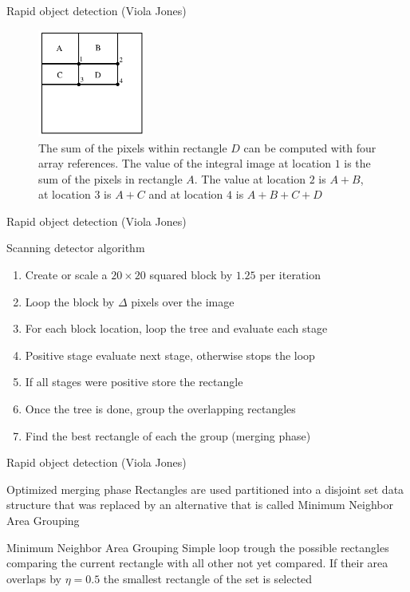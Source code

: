 \documentclass{beamer}
\begin{document}
\begin{frame}{Rapid object detection (Viola Jones)}
  \begin{figure}[!htb]
    \centering
    \includegraphics[width=100pt]{integral_image.pdf}
    \caption{The sum of the pixels within rectangle $D$ can be computed with four array references. The value of the integral image at location $1$ is the sum of the pixels in rectangle $A$. The value at location $2$ is $A + B$, at location $3$ is $A + C$ and at location $4$ is $A + B + C + D$}
    \label{figure:integral_image}
  \end{figure}
\end{frame}
\begin{frame}{Rapid object detection (Viola Jones)}
  \begin{block}{Scanning detector algorithm}
      \begin{enumerate}
        \item Create or scale a $20\times20$ squared block by $1.25$ per iteration
        \item Loop the block by $\Delta$ pixels over the image
        \item For each block location, loop the tree and evaluate each stage
        \item Positive stage evaluate next stage, otherwise stops the loop
        \item If all stages were positive store the rectangle
        \item Once the tree is done, group the overlapping rectangles
        \item Find the best rectangle of each the group (merging phase)
      \end{enumerate}
  \end{block}
\end{frame}
\begin{frame}{Rapid object detection (Viola Jones)}
  \begin{block}{Optimized merging phase}
      Rectangles are used partitioned into a disjoint set data structure that was replaced by an alternative that is called Minimum Neighbor Area Grouping
  \end{block}
  \begin{block}{Minimum Neighbor Area Grouping}
      Simple loop trough the possible rectangles comparing the current rectangle with all other not yet compared. If their area overlaps by $\eta=0.5$ the smallest rectangle of the set is selected
  \end{block}
\end{frame}
\end{document}
